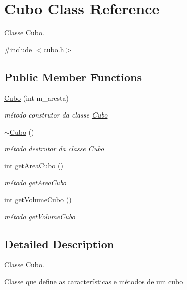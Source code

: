 \hypertarget{classCubo}{}\section{Cubo Class Reference}
\label{classCubo}


Classe \hyperlink{classCubo}{Cubo}.  




{\ttfamily \#include $<$cubo.\+h$>$}

\subsection*{Public Member Functions}
\begin{DoxyCompactItemize}
\item 
\hyperlink{classCubo_a258845d47a09d498b8a37db6220d27dd}{Cubo} (int m\+\_\+aresta)
\begin{DoxyCompactList}\small\item\em método construtor da classe \hyperlink{classCubo}{Cubo} \end{DoxyCompactList}\item 
\hyperlink{classCubo_ada9f424711b825757aaf553f82949522}{$\sim$\+Cubo} ()
\begin{DoxyCompactList}\small\item\em método destrutor da classe \hyperlink{classCubo}{Cubo} \end{DoxyCompactList}\item 
int \hyperlink{classCubo_a5119610ad9a58b91fa4c9f640954298f}{get\+Area\+Cubo} ()
\begin{DoxyCompactList}\small\item\em método get\+Area\+Cubo \end{DoxyCompactList}\item 
int \hyperlink{classCubo_a281ea6e47c4cb4c6eae0db89c186dee2}{get\+Volume\+Cubo} ()
\begin{DoxyCompactList}\small\item\em método get\+Volume\+Cubo \end{DoxyCompactList}\end{DoxyCompactItemize}


\subsection{Detailed Description}
Classe \hyperlink{classCubo}{Cubo}. 

Classe que define as características e métodos de um cubo 

